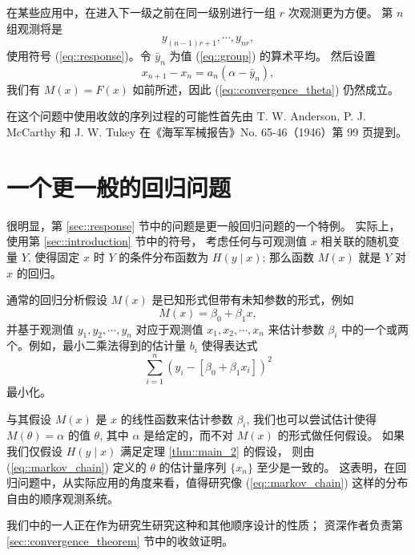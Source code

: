\documentclass{article}
\begin{document}
在某些应用中，在进入下一级之前在同一级别进行一组 $r$ 次观测更为方便。
第 $n$ 组观测将是
\begin{equation}
    \label{eq::group}
    y_{(n-1)r+1}, \cdots, y_{nr},
\end{equation}
使用符号 (\ref{eq::response})。令 $\bar{y}_n$ 为值 (\ref{eq::group}) 的算术平均。
然后设置
\begin{equation}
    x_{n+1} - x_n = a_n (\alpha - \bar{y}_n),
\end{equation}
我们有 $M(x) = F(x)$ 如前所述，因此 (\ref{eq::convergence_theta}) 仍然成立。

在这个问题中使用收敛的序列过程的可能性首先由 T. W. Anderson, P. J. McCarthy 
和 J. W. Tukey 在《海军军械报告》No. 65-46（1946）第 99 页提到。
 
\section{一个更一般的回归问题}

很明显，第 \ref{sec::response} 节中的问题是更一般回归问题的一个特例。
实际上，使用第 \ref{sec::introduction} 节中的符号，
考虑任何与可观测值 $x$ 相关联的随机变量 $Y$, 使得固定 $x$ 时 $Y$ 的条件分布函数为 
$H(y \mid x)$; 那么函数 $M(x)$ 就是 $Y$ 对 $x$ 的回归。

通常的回归分析假设 $M(x)$ 是已知形式但带有未知参数的形式，例如
\begin{equation}
    M(x) = \beta_0 + \beta_1 x,
\end{equation}
并基于观测值 $y_1, y_2, \cdots, y_n$ 对应于观测值 $x_1, x_2, \cdots, x_n$ 
来估计参数 $\beta_i$ 中的一个或两个。例如，最小二乘法得到的估计量 $b_i$ 使得表达式
\begin{equation}
    \sum_{i=1}^{n} (y_i - [\beta_0 + \beta_1 x_i])^2
\end{equation}
最小化。

与其假设 $M(x)$ 是 $x$ 的线性函数来估计参数 $\beta_i$, 
我们也可以尝试估计使得 $M(\theta) = \alpha$ 的值 $\theta$, 
其中 $\alpha$ 是给定的，而不对 $M(x)$ 的形式做任何假设。
如果我们仅假设 $H(y \mid x)$ 满足定理 \ref{thm::main_2} 的假设，
则由 (\ref{eq::markov_chain}) 定义的 $\theta$ 的估计量序列 $\{x_n\}$ 至少是一致的。
这表明，在回归问题中，从实际应用的角度来看，值得研究像 (\ref{eq::markov_chain}) 
这样的分布自由的顺序观测系统。

我们中的一人正在作为研究生研究这种和其他顺序设计的性质；
资深作者负责第 \ref{sec::convergence_theorem} 节中的收敛证明。



\end{document}

